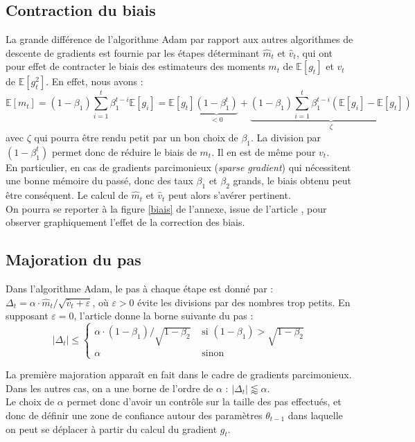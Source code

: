 \documentclass[11pt,a4paper, french]{article}
\newcommand{\dsum}[2]{\displaystyle\sum_{#1}^{#2}}
\theoremstyle{definition}
\begin{document}
\subsection{Contraction du biais}

La grande différence de l'algorithme Adam par rapport aux autres algorithmes de descente de gradients est fournie par les étapes déterminant $\widehat m_t$ et $\widehat v_t$, qui ont pour effet de contracter le biais des estimateurs des moments $m_t$ de $\mathbb E[g_t]$ et $v_t$ de $\mathbb E[g_t^2]$. En effet, nous avons :
$$\mathbb E[m_t]=(1-\beta_1)\dsum{i=1}t\beta_1^{t-i}\mathbb E[g_i]= \mathbb E[g_t]\underset{<0}{\underbrace{(1-\beta_1^t)}}+\underset{\zeta}{\underbrace{(1-\beta_1)\dsum{i=1}t\beta_1^{t-i}(\mathbb E[g_i]-\mathbb E[g_t])}}$$
avec $\zeta$ qui pourra être rendu petit par un bon choix de $\beta_1$. La division par $(1-\beta_1^t)$ permet donc de réduire le biais de $m_t$. Il en est de même pour $v_t$. \\
En particulier, en cas de gradients parcimonieux (\textit{sparse gradient}) qui nécessitent une bonne mémoire du passé, donc des taux $\beta_1$ et $\beta_2$ grands, le biais obtenu peut être conséquent. Le calcul de $\widehat m_t$ et $\widehat v_t$ peut alors s'avérer pertinent.\\
On pourra se reporter à la figure \ref{biais} de l'annexe, issue de l'article \cite{kingma2017adammethodstochasticoptimization}, pour observer graphiquement l'effet de la correction des biais.


\subsection{Majoration du pas}

Dans l'algorithme Adam, le pas à chaque étape est donné par : $\Delta_t=\alpha\cdotp \widehat m_t/\sqrt{\widehat v_t+\varepsilon}$, où $\varepsilon>0$ évite les divisions par des nombres trop petits. En supposant $\varepsilon=0$, l'article donne la borne suivante du pas : 
$$|\Delta_t|\leqslant \left\{\begin{array}{ll}
\alpha\cdotp (1-\beta_1)/\sqrt{1-\beta_2} & \text{ si }(1-\beta_1)>\sqrt{1-\beta_2}\\
\alpha & \text{ sinon}
\end{array}\right.
$$

La première majoration apparaît en fait dans le cadre de gradients parcimonieux. Dans les autres cas, on a une borne de l'ordre de $\alpha$ : $|\Delta_t|\lessapprox \alpha$.\\
Le choix de $\alpha$ permet donc d'avoir un contrôle sur la taille des pas effectués, et donc de définir une \og zone de confiance\fg{} autour des paramètres $\theta_{t-1}$ dans laquelle on peut se déplacer à partir du calcul du gradient $g_t$.
\end{document}
